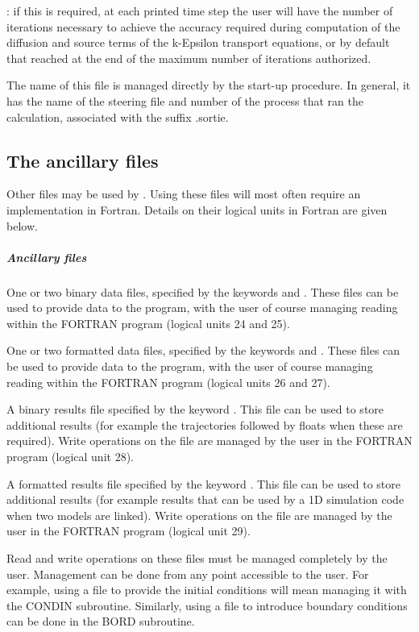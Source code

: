  : if this is required, at each printed time step the user will have the number of iterations necessary to achieve the accuracy required during computation of the diffusion and source terms of the k-Epsilon transport equations, or by default that reached at the end of the maximum number of iterations authorized.

 The name of this file is managed directly by the  start-up procedure. In general, it has the name of the steering file and number of the process that ran the calculation, associated with the suffix .sortie.


\subsection{ The ancillary files}

 Other files may be used by . Using these files will most often require an implementation in Fortran. Details on their logical units in Fortran are given below.


\subparagraph{ Ancillary files}

 One or two binary data files, specified by the keywords  and  . These files can be used to provide data to the program, with the user of course managing reading within the FORTRAN program (logical units 24 and 25).

 One or two formatted data files, specified by the keywords  and .  These files can be used to provide data to the program, with the user of course managing reading within the FORTRAN program (logical units 26 and 27).

 A binary results file specified by the keyword . This file can be used to store additional results (for example the trajectories followed by floats when these are required). Write operations on the file are managed by the user in the FORTRAN program (logical unit 28).

 A formatted results file specified by the keyword . This file can be used to store additional results (for example results that can be used by a 1D simulation code when two models are linked). Write operations on the file are managed by the user in the FORTRAN program (logical unit 29).

 Read and write operations on these files must be managed completely by the user. Management can be done from any point accessible to the user. For example, using a file to provide the initial conditions will mean managing it with the CONDIN subroutine. Similarly, using a file to introduce boundary conditions can be done in the BORD subroutine.

